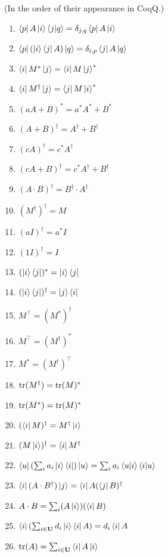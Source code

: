 \documentclass[manuscript, review, timestamp]{acmart}
\begin{document}
(In the order of their appearance in CoqQ.)
\begin{enumerate}
  \item \pass $\bra{p}A\ket{i}\braket{j|q} = \delta_{j,q}\bra{p}A\ket{i}$
  \item \pass $\bra{p}(\ket{i}\bra{j}A)\ket{q} = \delta_{i, p}\bra{j}A\ket{q}$
  \item \pass $\bra{i}M^*\ket{j} = \bra{i}M\ket{j}^*$
  \item \pass $\bra{i}M^\dagger\ket{j} = \bra{j}M\ket{i}^*$
  \item \pass $(a A + B)^* = a^* A^* + B^*$
  \item \pass $(A+B)^\dagger = A^\dagger + B^\dagger$
  \item \pass $(c A)^\dagger = c^* A^\dagger$
  \item \pass $(c A + B)^\dagger = c^* A^\dagger + B^\dagger$
  \item \pass $(A \cdot B)^\dagger = B^\dagger \cdot A^\dagger$
  \item \pass $(M^\dagger)^\dagger = M$
  \item \pass $(aI)^\dagger = a^* I$
  \item \pass $(1 I)^\dagger = I$
  \item \pass $(\ket{i}\bra{j})^* = \ket{i}\bra{j}$
  \item \pass $(\ket{i}\bra{j})^\dagger = \ket{j}\bra{i}$
  \item \pass $M^\top = (M^*)^\dagger$
  \item \pass $M^\top = (M^\dagger)^*$
  \item \pass $M^* = (M^\dagger)^\top$
  \item \pass $\mathrm{tr}(M^\dagger) = \mathrm{tr}(M)^*$
  \item \pass $\mathrm{tr}(M^*) = \mathrm{tr}(M)^*$
  \item \pass $(\bra{i}M)^\dagger = M^\dagger \ket{i}$
  \item \pass $(M \ket{i})^\dagger = \bra{i} M^\dagger$
  \item \pass $\bra{u} \left( \sum_{i} a_i \ket{i}\bra{i} \right) \ket{u} = \sum_i a_i \braket{u|i}\braket{i|u}$
  \item \pass $\bra{i}(A\cdot B^\dagger)\ket{j} = \bra{i} A (\bra{j}B)^\dagger$
  \item \pass $A \cdot B = \sum_i (A \ket{i})(\bra{i} B)$
  \item \pass $\bra{i}(\sum_{i \in \mathbf{U}} d_i \ket{i}\bra{i} A) = d_i \bra{i} A$
  \item \pass $\mathrm{tr}(A) = \sum_{i \in \mathbf{U}}\bra{i} A \ket{i}$

\end{enumerate}
\end{document}
